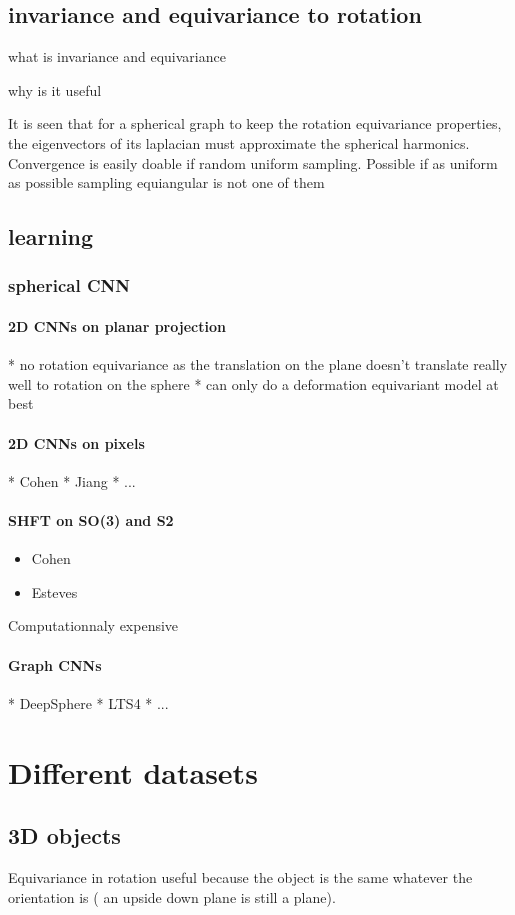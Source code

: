 \documentclass[11pt]{report}
\begin{document}
\section{invariance and equivariance to rotation}
what is invariance and equivariance

why is it useful

It is seen that for a spherical graph to keep the rotation equivariance properties, the eigenvectors of its laplacian must approximate the spherical harmonics. Convergence is easily doable if random uniform sampling. %
Possible if as uniform as possible sampling
equiangular is not one of them
\section{learning}
\subsection{spherical CNN}
\subsubsection{2D CNNs on planar projection}
* no rotation equivariance as the translation on the plane doesn't translate really well to rotation on the sphere
* can only do a deformation equivariant model at best
\subsubsection{2D CNNs on pixels}
* Cohen
* Jiang
* ...
\subsubsection{SHFT on SO(3) and S2}
\begin{itemize}
    \item Cohen
    \item Esteves
\end{itemize}
Computationnaly expensive
\subsubsection{Graph CNNs}
* DeepSphere
* LTS4
* ...

\chapter{Different datasets}
\section{3D objects}
Equivariance in rotation useful because the object is the same whatever the orientation is ( an upside down plane is still a plane).
\end{document}
